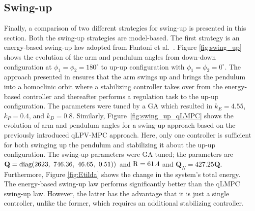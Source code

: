 \subsection{Swing-up}
\label{sec:Results_swingup}
Finally, a comparison of two different strategies for swing-up is presented in this section. Both the swing-up strategies are model-based. The first strategy is an energy-based swing-up law adopted from Fantoni et al.~\cite{Fantoni}. Figure \ref{fig:swing_up} shows the evolution of the arm and pendulum angles from down-down configuration at $\phi_1 = \phi_2 = 180^\circ$ to up-up configuration with $\phi_1 = \phi_2 = 0^\circ.$ The approach presented in \cite{Fantoni} ensures that the arm swings up and brings the pendulum into a homoclinic orbit where a stabilizing controller takes over from the energy-based controller and thereafter performs a regulation task to the up-up configuration. The parameters were tuned by a GA which resulted in $k_E = 4.55 $, $k_P = 0.4$, and $k_D = 0.8$. Similarly, Figure~\ref{fig:swing_up_qLMPC} shows the evolution of arm and pendulum angles for a swing-up approach based on the previously introduced qLPV-MPC approach. Here, only one controller is sufficient for both swinging up the pendulum and stabilizing it about the up-up configuration. The swing-up parameters were GA tuned; the parameters are $\mathbf{Q} = \textup{diag}(2623,~746.36,~46.65,~0.51))$ and $\textup{R} = 61.4$ and $\mathbf{Q}_N = 427.25\mathbf{Q}$. Furthermore, Figure \ref{fig:Etilda} shows the change in the system's total energy. The energy-based swing-up law performs significantly better than the qLMPC swing-up law. However, the latter has the advantage that it is just a single controller, unlike the former, which requires an additional stabilizing controller. 
% 
